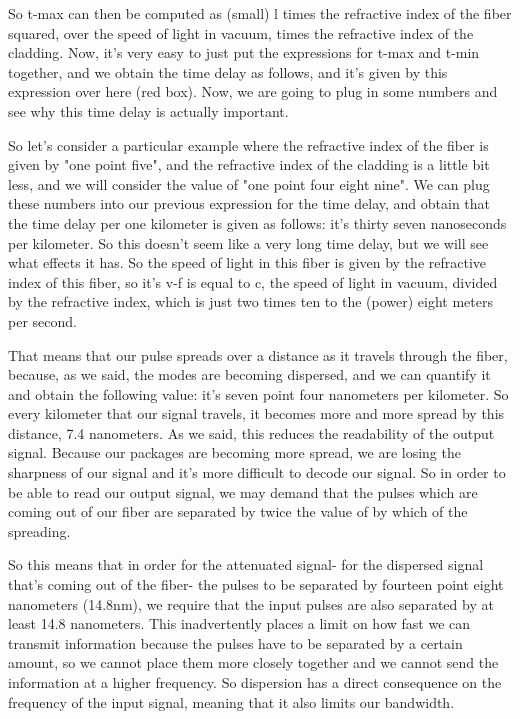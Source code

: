 So t-max can then be computed as (small) l times the refractive index of the fiber squared, over the speed of light in vacuum, times the refractive index of the cladding. Now, it's very easy to just put the expressions for t-max and t-min together, and we obtain the time delay as follows, and it's given by this expression over here (red box). Now, we are going to plug in some numbers and see why this time delay is actually important.

So let's consider a particular example where the refractive index of the fiber is given by "one point five", and the refractive index of the cladding is a little bit less, and we will consider the value of "one point four eight nine". We can plug these numbers into our previous expression for the time delay, and obtain that the time delay per one kilometer is given as follows: it's thirty seven nanoseconds per kilometer. So this doesn't seem like a very long time delay, but we will see what effects it has. So the speed of light in this fiber is given by the refractive index of this fiber, so it's v-f is equal to c, the speed of light in vacuum, divided by the refractive index, which is just two times ten to the (power) eight meters per second.

That means that our pulse spreads over a distance as it travels through the fiber, because, as we said, the modes are becoming dispersed, and we can quantify it and obtain the following value: it's seven point four nanometers per kilometer. So every kilometer that our signal travels, it becomes more and more spread by this distance, 7.4 nanometers. As we said, this reduces the readability of the output signal. Because our packages are becoming more spread, we are losing the sharpness of our signal and it's more difficult to decode our signal. So in order to be able to read our output signal, we may demand that the pulses which are coming out of our fiber are separated by twice the value of by which of the spreading.

So this means that in order for the attenuated signal- for the dispersed signal that's coming out of the fiber- the pulses to be separated by fourteen point eight nanometers (14.8nm), we require that the input pulses are also separated by at least 14.8 nanometers. This inadvertently places a limit on how fast we can transmit information because the pulses have to be separated by a certain amount, so we cannot place them more closely together and we cannot send the information at a higher frequency. So dispersion has a direct consequence on the frequency of the input signal, meaning that it also limits our bandwidth.



